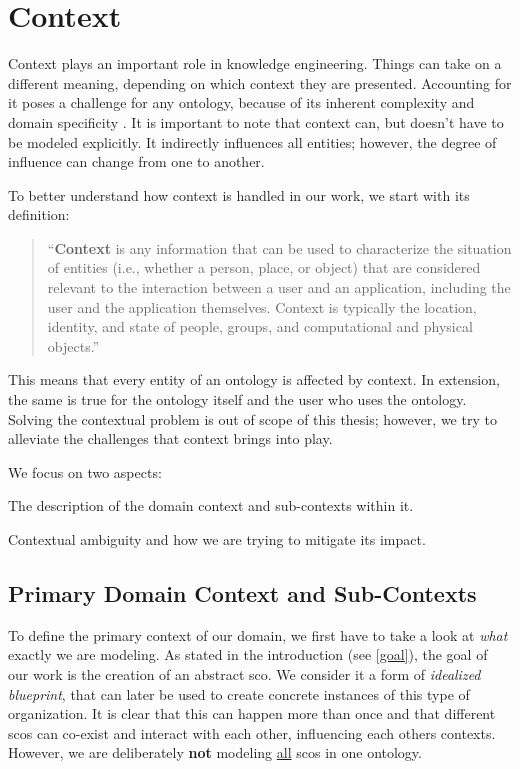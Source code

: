 \documentclass[a4paper, DIV=13, BCOR=0cm]{scrbook}
\begin{document}
\section{Context }
\label{context}
Context plays an important role in knowledge engineering. Things can take on a different meaning, depending on which context they are presented. Accounting for it poses a challenge for any ontology, because of its inherent complexity and domain specificity \cite[p.\,1]{moore2012intelligent}. It is important to note that context can, but doesn't have to be modeled explicitly. It indirectly influences all entities; however, the degree of influence can change from one to another.

To better understand how context is handled in our work, we start with its definition:
\begin{quote}
	\enquote{\textbf{Context} is any information that can be used to characterize the situation of entities (i.e., whether a person, place, or object) that are considered relevant to the interaction between a user and an application, including the user and the application themselves. Context is typically the location, identity, and state of people, groups, and computational and physical objects.} \cite[p.\,106]{dey2001conceptual}
\end{quote}

This means that every entity of an ontology is affected by context. In extension, the same is true for the ontology itself and the user who uses the ontology. Solving the contextual problem is out of scope of this thesis; however, we try to alleviate the challenges that context brings into play.

We focus on two aspects:
\begin{inparaenum}
	\item The description of the domain context and sub-contexts within it.
	\item Contextual ambiguity and how we are trying to mitigate its impact.
\end{inparaenum}

\subsection{Primary Domain Context and Sub-Contexts}
To define the primary context of our domain, we first have to take a look at \textit{what} exactly we are modeling. As stated in the introduction (see \autoref{goal}), the goal of our work is the creation of an abstract \gls{sco}. We consider it a form of \textit{idealized blueprint}, that can later be used to create concrete instances of this type of organization. It is clear that this can happen more than once and that different \glspl{sco} can co-exist and interact with each other, influencing each others contexts. However, we are deliberately \textbf{not} modeling \underline{all} \glspl{sco} in one ontology.
\end{document}
